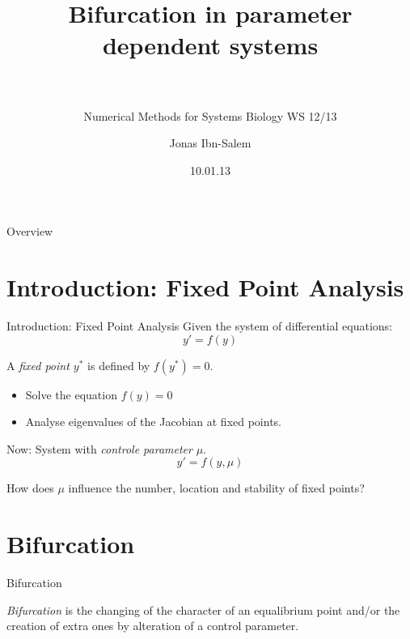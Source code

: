 \documentclass{beamer}
\title[Bifurcation]{Bifurcation in parameter dependent systems\\~\\}
\subtitle{Numerical Methods for Systems Biology WS 12/13}
\author[Jonas Ibn-Salem]{Jonas Ibn-Salem}
\institute[]{}
\date{10.01.13}
\begin{document}
\maketitle


\begin{frame}{Overview}
    \tableofcontents
\end{frame}

\section{Introduction: Fixed Point Analysis}
\begin{frame}{Introduction: Fixed Point Analysis}
    Given the system of differential equations:
    $$y' = f(y) $$
    \begin{definition}
        A \emph{fixed point $y^*$} is defined by $f(y^*)=0$.
    \end{definition}
    \begin{itemize}
        \item Solve the equation $f(y) = 0$ 
        \item Analyse eigenvalues of the Jacobian at fixed points.
    \end{itemize}
    Now: System with \emph{controle parameter} $\mu$. 
    $$y' = f(y, \mu)$${}    
    \begin{block}{}
        How does $\mu$ influence the number, location and stability of fixed points?
    \end{block}
\end{frame}
\section{Bifurcation}

\begin{frame}{Bifurcation}
    \begin{definition}
        \emph{Bifurcation} is the changing of the character of an equalibrium point and/or the creation of extra ones by alteration of a control parameter.
    \end{definition}

\end{frame}
\end{document}
